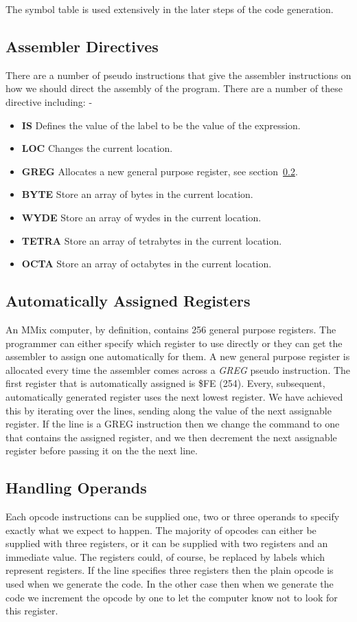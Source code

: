 \documentclass[a4paper,11pt]{report}
\begin{document}
The symbol table is used extensively in the later steps of the code generation.
\subsection{Assembler Directives}
There are a number of pseudo instructions that give the assembler instructions on how we should direct the assembly of the program. There are a number of these directive including: -
\begin{itemize}
\item \textbf{IS} Defines the value of the label to be the value of the expression.
\item \textbf{LOC} Changes the current location.
\item \textbf{GREG} Allocates a new general purpose register, see section~\ref{greg}.
\item \textbf{BYTE} Store an array of bytes in the current location. 
\item \textbf{WYDE} Store an array of wydes in the current location.
\item \textbf{TETRA} Store an array of tetrabytes in the current location.
\item \textbf{OCTA} Store an array of octabytes in the current location.
\end{itemize}
\subsection{Automatically Assigned Registers}\label{greg}
An MMix computer, by definition, contains 256 general purpose registers. The programmer can either specify which register to use directly or they can get the assembler to assign one automatically for them. A new general purpose register is allocated every time the assembler comes across a \textit{GREG} pseudo instruction. The first register that is automatically assigned is \$FE (254). Every, subsequent, automatically generated register uses the next lowest register. We have achieved this by iterating over the lines, sending along the value of the next assignable register. If the line is a GREG instruction then we change the command to one that contains the assigned register, and we then decrement the next assignable register before passing it on the the next line.
\subsection{Handling Operands}
Each opcode instructions can be supplied one, two or three operands to specify exactly what we expect to happen. The majority of opcodes can either be supplied with three registers, or it can be supplied with two registers and an immediate value. The registers could, of course, be replaced by labels which represent registers. If the line specifies three registers then the plain opcode is used when we generate the code. In the other case then when we generate the code we increment the opcode by one to let the computer know not to look for this register.
\end{document}
